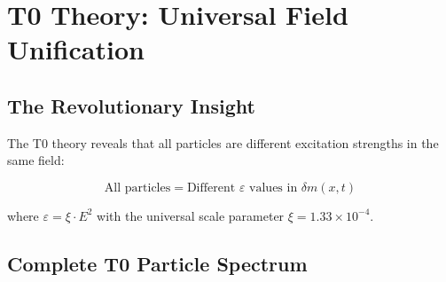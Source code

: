 \documentclass[12pt,a4paper]{article}
\newcommand{\deltam}{\delta m}
\newcommand{\xipar}{\xi}
\begin{document}
	\section{T0 Theory: Universal Field Unification}
	
	\subsection{The Revolutionary Insight}
	
	The T0 theory reveals that all particles are different excitation strengths in the same field:
	
	\begin{equation}
		\boxed{\text{All particles} = \text{Different } \varepsilon \text{ values in } \deltam(x,t)}
		\label{eq:universal_particle_principle}
	\end{equation}
	
	where $\varepsilon = \xipar \cdot E^2$ with the universal scale parameter $\xipar = 1.33 \times 10^{-4}$.
	
	\subsection{Complete T0 Particle Spectrum}
	
\end{document}
